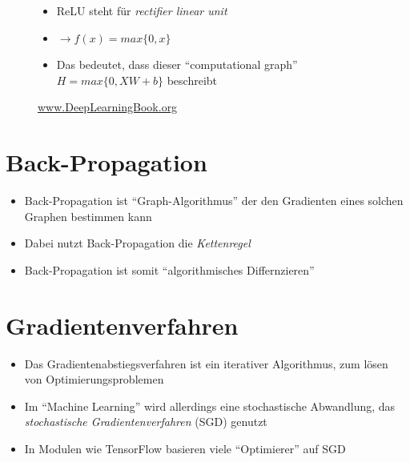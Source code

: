 \documentclass[t]{beamer}
\begin{document}
\begin{frame}
\begin{figure}
\begin{minipage}{0.45\textwidth}
\begin{itemize}
                \item ReLU steht für \emph{rectifier linear unit}
                \item \(\rightarrow f(x) = max\{0, x\}\) \newline
                \item Das bedeutet, dass dieser \enquote{computational graph} \(H = max\{0, XW + b\}\) beschreibt
            \end{itemize}
        \end{minipage}
        \caption{\href{http://www.deeplearningbook.org}{www.DeepLearningBook.org}}
    \end{figure}
\end{frame}

\section{Back-Propagation}
\begin{frame}
    \begin{itemize}
        \item Back-Propagation ist \enquote{Graph-Algorithmus} der den Gradienten eines solchen Graphen bestimmen kann
        \item Dabei nutzt Back-Propagation die \emph{Kettenregel} \newline
        \item Back-Propagation ist somit \enquote{algorithmisches Differnzieren}
    \end{itemize}
\end{frame}

\section{Gradientenverfahren}
\begin{frame}
    \begin{itemize}
        \item Das Gradientenabstiegsverfahren ist ein iterativer Algorithmus, zum lösen von Optimierungsproblemen \newline
        \item Im \enquote{Machine Learning} wird allerdings eine stochastische Abwandlung, das \emph{stochastische Gradientenverfahren} (SGD) genutzt \newline
        \item In Modulen wie TensorFlow basieren viele \enquote{Optimierer} auf SGD
    \end{itemize}
\end{frame}
\end{document}
